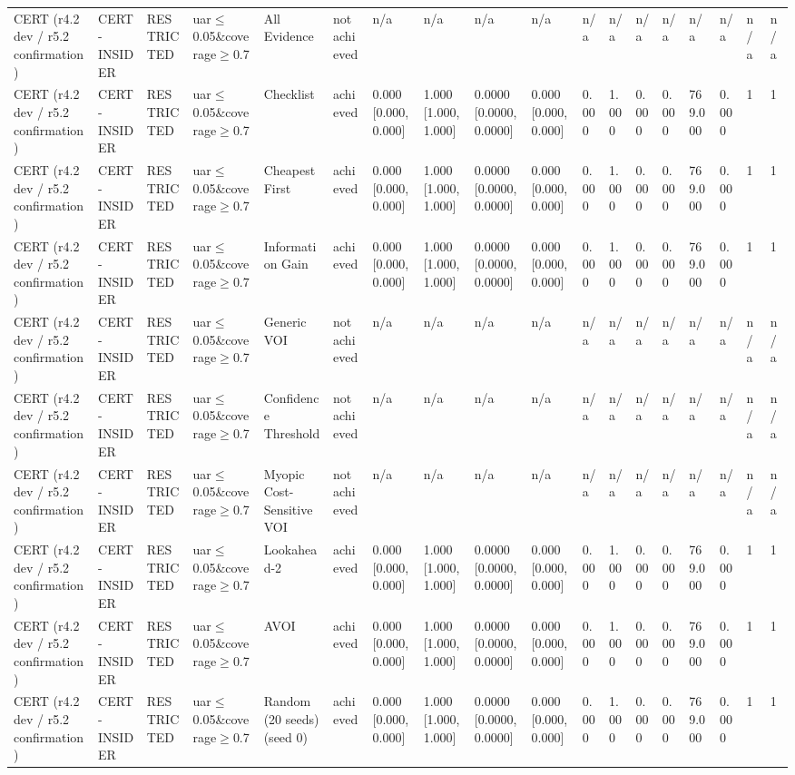 \begin{table}[!ht]
{\begin{tabular}{llllllllllllllllll}
CERT (r4.2 dev / r5.2 confirmation) & CERT-INSIDER & RESTRICTED & uar$\le$0.05\&coverage$\ge$0.7 & All Evidence & not achieved & n/a & n/a & n/a & n/a & n/a & n/a & n/a & n/a & n/a & n/a & n/a & n/a \\
CERT (r4.2 dev / r5.2 confirmation) & CERT-INSIDER & RESTRICTED & uar$\le$0.05\&coverage$\ge$0.7 & Checklist & achieved & 0.000 [0.000, 0.000] & 1.000 [1.000, 1.000] & 0.0000 [0.0000, 0.0000] & 0.000 [0.000, 0.000] & 0.000 & 1.000 & 0.000 & 0.000 & 769.000 & 0.000 & 1 & 1 \\
CERT (r4.2 dev / r5.2 confirmation) & CERT-INSIDER & RESTRICTED & uar$\le$0.05\&coverage$\ge$0.7 & Cheapest First & achieved & 0.000 [0.000, 0.000] & 1.000 [1.000, 1.000] & 0.0000 [0.0000, 0.0000] & 0.000 [0.000, 0.000] & 0.000 & 1.000 & 0.000 & 0.000 & 769.000 & 0.000 & 1 & 1 \\
CERT (r4.2 dev / r5.2 confirmation) & CERT-INSIDER & RESTRICTED & uar$\le$0.05\&coverage$\ge$0.7 & Information Gain & achieved & 0.000 [0.000, 0.000] & 1.000 [1.000, 1.000] & 0.0000 [0.0000, 0.0000] & 0.000 [0.000, 0.000] & 0.000 & 1.000 & 0.000 & 0.000 & 769.000 & 0.000 & 1 & 1 \\
CERT (r4.2 dev / r5.2 confirmation) & CERT-INSIDER & RESTRICTED & uar$\le$0.05\&coverage$\ge$0.7 & Generic VOI & not achieved & n/a & n/a & n/a & n/a & n/a & n/a & n/a & n/a & n/a & n/a & n/a & n/a \\
CERT (r4.2 dev / r5.2 confirmation) & CERT-INSIDER & RESTRICTED & uar$\le$0.05\&coverage$\ge$0.7 & Confidence Threshold & not achieved & n/a & n/a & n/a & n/a & n/a & n/a & n/a & n/a & n/a & n/a & n/a & n/a \\
CERT (r4.2 dev / r5.2 confirmation) & CERT-INSIDER & RESTRICTED & uar$\le$0.05\&coverage$\ge$0.7 & Myopic Cost-Sensitive VOI & not achieved & n/a & n/a & n/a & n/a & n/a & n/a & n/a & n/a & n/a & n/a & n/a & n/a \\
CERT (r4.2 dev / r5.2 confirmation) & CERT-INSIDER & RESTRICTED & uar$\le$0.05\&coverage$\ge$0.7 & Lookahead-2 & achieved & 0.000 [0.000, 0.000] & 1.000 [1.000, 1.000] & 0.0000 [0.0000, 0.0000] & 0.000 [0.000, 0.000] & 0.000 & 1.000 & 0.000 & 0.000 & 769.000 & 0.000 & 1 & 1 \\
CERT (r4.2 dev / r5.2 confirmation) & CERT-INSIDER & RESTRICTED & uar$\le$0.05\&coverage$\ge$0.7 & AVOI & achieved & 0.000 [0.000, 0.000] & 1.000 [1.000, 1.000] & 0.0000 [0.0000, 0.0000] & 0.000 [0.000, 0.000] & 0.000 & 1.000 & 0.000 & 0.000 & 769.000 & 0.000 & 1 & 1 \\
CERT (r4.2 dev / r5.2 confirmation) & CERT-INSIDER & RESTRICTED & uar$\le$0.05\&coverage$\ge$0.7 & Random (20 seeds) (seed 0) & achieved & 0.000 [0.000, 0.000] & 1.000 [1.000, 1.000] & 0.0000 [0.0000, 0.0000] & 0.000 [0.000, 0.000] & 0.000 & 1.000 & 0.000 & 0.000 & 769.000 & 0.000 & 1 & 1 \\

\end{tabular}}
\end{table}
